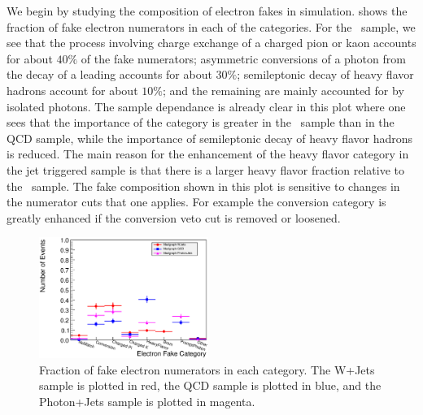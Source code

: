 \documentclass{cmspaper}
\begin{document}
\clearpage


We begin by studying the composition of electron fakes in simulation.  shows the fraction of fake electron numerators in each of the categories. For the \WPlusJets\ sample, we see that the process involving charge exchange of a charged pion or kaon accounts for about $40\%$ of the fake numerators; asymmetric conversions of a photon from the decay of a leading \pizero accounts for about $30\%$; semileptonic decay of heavy flavor hadrons account for about $10\%$; and the remaining are mainly accounted for by isolated photons. The sample dependance is already clear in this plot where one sees that the importance of the \pizero category is greater in the \WPlusJets\ sample than in the QCD sample, while the importance of semileptonic decay of heavy flavor hadrons is reduced. The main reason for the enhancement of the heavy flavor category in the jet triggered sample is that there is a larger heavy flavor fraction relative to the \WPlusJets\ sample. The fake composition shown in this plot is sensitive to changes in the numerator cuts that one applies. For example the \pizero conversion category is greatly enhanced if the conversion veto cut is removed or loosened.


\begin{figure}[htb]
\begin{center}
\includegraphics[width=0.49\textwidth]{plots/ElectronNumeratorFakeCategory_Madgraph_WJetsVsQCD.eps}
   \caption{Fraction of fake electron numerators in each category. The W+Jets sample is plotted in red, the QCD sample is plotted in blue, and the Photon+Jets sample is plotted in magenta.}
   \label{fig:ElectronNumerator_FakeCategory}
\end{center}
\end{figure}
\end{document}
